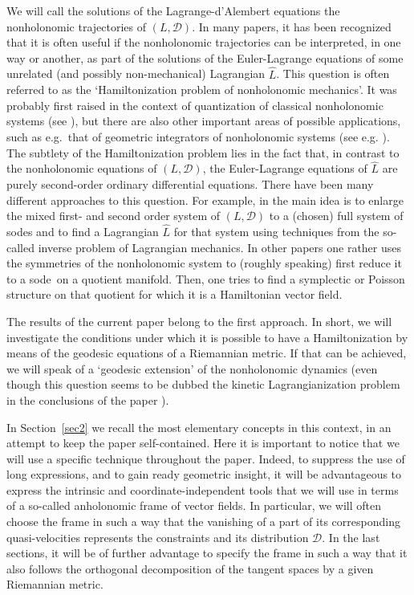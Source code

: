 \documentclass[11pt]{article}
\def\sode{{\sc sode}}
\def\D{{\mathcal D}}
\begin{document}
We will call  the solutions of the Lagrange-d'Alembert equations the nonholonomic trajectories of $(L,\D)$. In many papers, it has been recognized that it is often useful if the nonholonomic trajectories can be interpreted, in one way or another, as part of  the solutions of the Euler-Lagrange equations of some unrelated (and possibly non-mechanical) Lagrangian $\hat L$. This question is often referred to as the `Hamiltonization problem of nonholonomic mechanics'. It was probably first raised in the context of quantization of classical nonholonomic systems (see \cite{abud,BR,quant}), but there are also other important areas of  possible applications, such as e.g.\ that of geometric integrators of nonholonomic systems (see e.g. \cite{FernandezOlver,TomBrussel}). 
The subtlety of the Hamiltonization problem  lies in the fact that, in contrast to the nonholonomic equations of $(L,\D)$, the Euler-Lagrange equations of $\hat L$ are purely second-order ordinary differential equations. 
There have been many different approaches to this question. For example, in \cite{BFM,marta} the main idea is to enlarge the mixed first- and second order system of $(L,\D)$  to a (chosen) full system of \sode s and to find a Lagrangian $\hat L$ for that system  using techniques from the so-called  inverse problem of Lagrangian mechanics. In other papers \cite{BalseiroFernandez,BalseiroNaranjo,Bol,Ehlers} one rather uses the symmetries of the nonholonomic system to (roughly speaking) first  reduce it to  a \sode\ on a quotient manifold. Then, one tries to find a symplectic or Poisson structure on that quotient for which it is a Hamiltonian vector field. 

The results of the current paper belong to the first approach. In short, we will investigate the conditions under which it is possible to have a Hamiltonization by means of the geodesic equations of a Riemannian metric. 
If that can be achieved,  we will speak of  a `geodesic extension' of the nonholonomic dynamics (even though this question seems to be dubbed the kinetic Lagrangianization  problem in the conclusions of the paper \cite{Simoes}).







In Section~\ref{sec2} we  recall  the most elementary concepts in this context, in an attempt to keep the  paper self-contained. Here it is important to notice that we will use a specific technique throughout the paper. Indeed, to suppress the use of long expressions, and to gain ready geometric insight, it will be advantageous to express the  intrinsic and coordinate-independent tools that we will use in terms of a so-called anholonomic frame of vector fields. In particular, we will often choose the frame in such a way that the vanishing of a part of its corresponding quasi-velocities represents the constraints and its distribution $\D$. In the last sections, it will be of further advantage to specify the frame in such a way that it also follows the orthogonal decomposition of the tangent spaces by a given Riemannian metric. 
\end{document}
